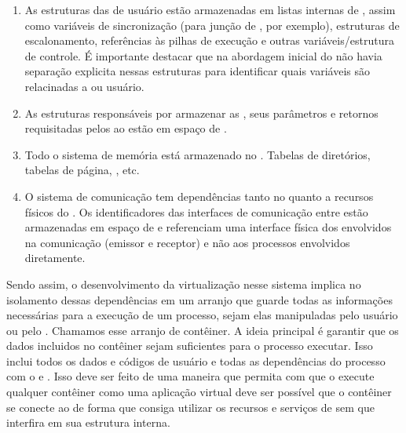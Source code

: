 \begin{enumerate}[label=(\roman*)]
    \item As estruturas das \threads de usuário estão armazenadas em listas internas de , assim como variáveis de sincronização (para junção de \threads, por exemplo), estruturas de escalonamento, referências às pilhas de execução e outras variáveis/estrutura de controle. É importante destacar que na abordagem inicial do \nanvix não havia separação explicita nessas estruturas para identificar quais variáveis são relacinadas a  ou usuário.
    \item As estruturas responsáveis por armazenar as \syscalls, seus parâmetros e retornos requisitadas pelos \scores ao \mcore estão em espaço de .
    \item Todo o sistema de memória está armazenado no . Tabelas de diretórios, tabelas de página, \tlbs, etc.
    \item O sistema de comunicação tem dependências tanto no  quanto a recursos físicos do \cluster. Os identificadores das interfaces \noc \ie de comunicação entre \clusters estão armazenadas em espaço de  e referenciam uma interface física dos \clusters envolvidos na comunicação (emissor e receptor) e não aos processos envolvidos diretamente.
\end{enumerate}

Sendo assim, o desenvolvimento da virtualização nesse sistema implica no isolamento dessas dependências em um arranjo que guarde todas as informações necessárias para a execução de um processo, sejam elas manipuladas pelo usuário ou pelo . Chamamos esse arranjo de contêiner. A ideia principal é garantir que os dados incluidos no contêiner sejam suficientes para o processo executar. Isso inclui todos os dados e códigos de usuário e todas as dependências do processo com o  e \cluster. Isso deve ser feito de uma maneira que permita com que o  execute qualquer contêiner como uma aplicação virtual \ie deve ser possível que o contêiner se conecte ao  de forma que consiga utilizar os recursos e serviços de  sem que interfira em sua estrutura interna.

